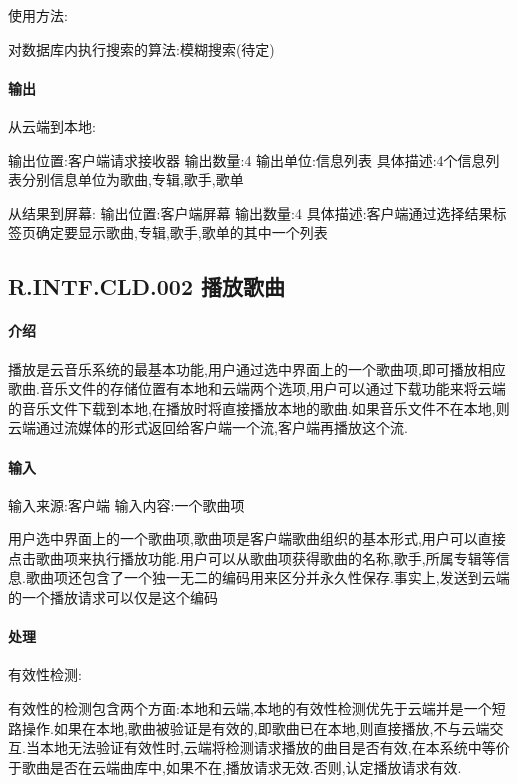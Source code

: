 使用方法:

对数据库内执行搜索的算法:模糊搜索(待定)




\paragraph{输出}

从云端到本地:

输出位置:客户端请求接收器
输出数量:4
输出单位:信息列表
具体描述:4个信息列表分别信息单位为歌曲,专辑,歌手,歌单

从结果到屏幕:
输出位置:客户端屏幕
输出数量:4
具体描述:客户端通过选择结果标签页确定要显示歌曲,专辑,歌手,歌单的其中一个列表

\subsection{R.INTF.CLD.002 播放歌曲}

\paragraph{介绍}

播放是云音乐系统的最基本功能,用户通过选中界面上的一个歌曲项,即可播放相应歌曲.音乐文件的存储位置有本地和云端两个选项,用户可以通过下载功能来将云端的音乐文件下载到本地,在播放时将直接播放本地的歌曲.如果音乐文件不在本地,则云端通过流媒体的形式返回给客户端一个流,客户端再播放这个流.

\paragraph{输入}

输入来源:客户端
输入内容:一个歌曲项

用户选中界面上的一个歌曲项,歌曲项是客户端歌曲组织的基本形式,用户可以直接点击歌曲项来执行播放功能.用户可以从歌曲项获得歌曲的名称,歌手,所属专辑等信息.歌曲项还包含了一个独一无二的编码用来区分并永久性保存.事实上,发送到云端的一个播放请求可以仅是这个编码

\paragraph{处理}

有效性检测:

有效性的检测包含两个方面:本地和云端,本地的有效性检测优先于云端并是一个短路操作.如果在本地,歌曲被验证是有效的,即歌曲已在本地,则直接播放,不与云端交互.当本地无法验证有效性时,云端将检测请求播放的曲目是否有效,在本系统中等价于歌曲是否在云端曲库中,如果不在,播放请求无效.否则,认定播放请求有效.

